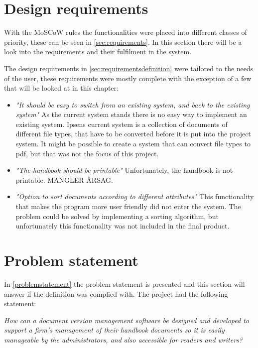 \section{Design requirements}
With the MoSCoW rules the functionalities were placed into different classes of priority, these can be seen in \cref{sec:requirements}.
In this section there will be a look into the requirements and their fulfilment in the system.

The design requirements in \cref{sec:requirementsdefinition} were tailored to the needs of the user, these requirements were mostly complete with the exception of a few that will be looked at in this chapter:

\begin{itemize}
	\item \textit{"It should be easy to switch from an existing system, and back to the existing system"}
	As the current system stands there is no easy way to implement an existing system.
Ipsens current system is a collection of documents of different file types, that have to be converted before it is put into the project system.
It might be possible to create a system that can convert file types to pdf, but that was not the focus of this project.
	\item \textit{"The handbook should be printable"}
	Unfortunately, the handbook is not printable.
MANGLER ÅRSAG.
	\item \textit{"Option to sort documents according to different attributes"}
	This functionality that makes the program more user friendly did not enter the system.
The problem could be solved by implementing a sorting algorithm, but unfortunately this functionality was not included in the final product.
\end{itemize}

\section{Problem statement}
In \cref{problemstatement} the problem statement is presented and this section will answer if the definition was complied with.
The project had the following statement:

\begin{center}
\textit{How can a document version management software be designed and developed to support a firm's management of their handbook documents so it is easily manageable by the administrators, and also accessible for readers and writers?}
\end{center}

